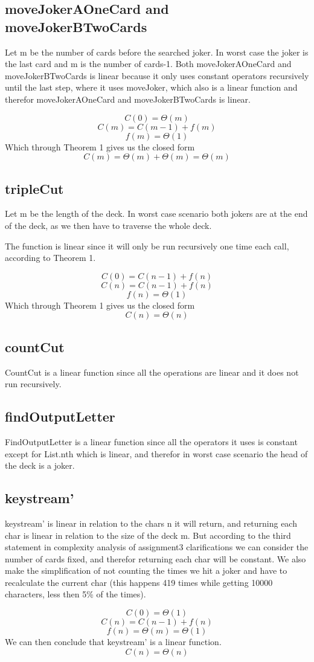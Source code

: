 \documentclass[12pt, a4paper]{article}
\begin{document}
\subsection{moveJokerAOneCard and moveJokerBTwoCards}
Let m be the number of cards before the searched joker. In worst case the joker is the last card and m is the number of cards-1.
Both moveJokerAOneCard and moveJokerBTwoCards is linear because it only uses constant operators recursively until the last step, where it uses moveJoker, which also is a linear function and therefor moveJokerAOneCard and moveJokerBTwoCards is linear.

$$C(0) = \Theta(m)$$
$$C(m) = C(m-1) + f(m)$$
$$f(m) = \Theta(1)$$
Which through Theorem 1 gives us the closed form
$$C(m) = \Theta(m) + \Theta(m) = \Theta(m)$$

\subsection{tripleCut}
Let m be the length of the deck. In worst case scenario both jokers are at the end of the deck, as we then have to traverse the whole deck.

The function is linear since it will only be run recursively one time each call, according to Theorem 1.

$$C(0) = C(n-1) + f(n)$$
$$C(n) = C(n-1) + f(n)$$
$$f(n) = \Theta(1)$$
Which through Theorem 1 gives us the closed form
$$C(n) = \Theta(n)$$

\subsection{countCut}
CountCut is a linear function since all the operations are linear and it does not run recursively.

\subsection{findOutputLetter}
FindOutputLetter is a linear function since all the operators it uses is constant except for List.nth which is linear, and therefor in worst case scenario the head of the deck is a joker.

\subsection{keystream'}
keystream' is linear in relation to the chars n it will return, and returning each char is linear in relation to the size of the deck m. But according to the third statement in complexity analysis of assignment3 clarifications we can consider the number of cards fixed, and therefor returning each char will be constant. We also make the simplification of not counting the times we hit a joker and have to recalculate the current char (this happens 419 times while getting 10000 characters, less then 5\% of the times).

$$C(0) = \Theta(1)$$
$$C(n) = C(n-1) + f(n)$$
$$f(n) = \Theta(m) = \Theta(1)$$
We can then conclude that keystream' is a linear function.
$$C(n) = \Theta(n)$$
\end{document}

